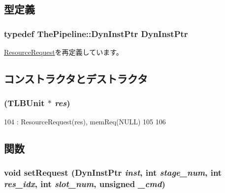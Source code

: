 \subsection{型定義}
\hypertarget{classTLBUnitRequest_af9d0c8a46736ba6aa2d8bb94da1a5e73}{
\subsubsection[{DynInstPtr}]{\setlength{\rightskip}{0pt plus 5cm}typedef {\bf ThePipeline::DynInstPtr} {\bf DynInstPtr}}}
\label{classTLBUnitRequest_af9d0c8a46736ba6aa2d8bb94da1a5e73}


\hyperlink{classResourceRequest_af9d0c8a46736ba6aa2d8bb94da1a5e73}{ResourceRequest}を再定義しています。

\subsection{コンストラクタとデストラクタ}
\hypertarget{classTLBUnitRequest_aac7d9e75487ae54bc4450762c00ba15e}{
\subsubsection[{TLBUnitRequest}]{ ({\bf TLBUnit} $\ast$ {\em res})}}
\label{classTLBUnitRequest_aac7d9e75487ae54bc4450762c00ba15e}



\begin{DoxyCode}
104         : ResourceRequest(res), memReq(NULL)
105     {
106     }
\end{DoxyCode}


\subsection{関数}
\hypertarget{classTLBUnitRequest_aff267a8ca11b384ffb71af061c690e2d}{
\subsubsection[{setRequest}]{\setlength{\rightskip}{0pt plus 5cm}void setRequest ({\bf DynInstPtr} {\em inst}, \/  int {\em stage\_\-num}, \/  int {\em res\_\-idx}, \/  int {\em slot\_\-num}, \/  unsigned {\em \_\-cmd})}}
\label{classTLBUnitRequest_aff267a8ca11b384ffb71af061c690e2d}


